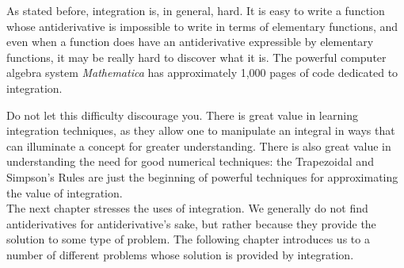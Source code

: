 As stated before, integration is, in general, hard. It is easy to write a function whose antiderivative is impossible to write in terms of elementary functions, and even when a function does have an antiderivative expressible by elementary functions, it may be really hard to discover what it is. The powerful computer algebra system \textit{Mathematica}\textsuperscript{\textregistered} has approximately 1,000 pages of code dedicated to integration. 

Do not let this difficulty discourage you. There is great value in learning integration techniques, as they allow one to manipulate an integral in ways that can illuminate a concept for greater understanding. There is also great value in understanding the need for good numerical techniques: the Trapezoidal and Simpson's Rules are just the beginning of powerful techniques for approximating the value of integration.\\

The next chapter stresses the uses of integration. We generally do not find antiderivatives for antiderivative's sake, but rather because they provide the solution to some type of problem. The following chapter introduces us to a number of different problems whose solution is provided by integration.

